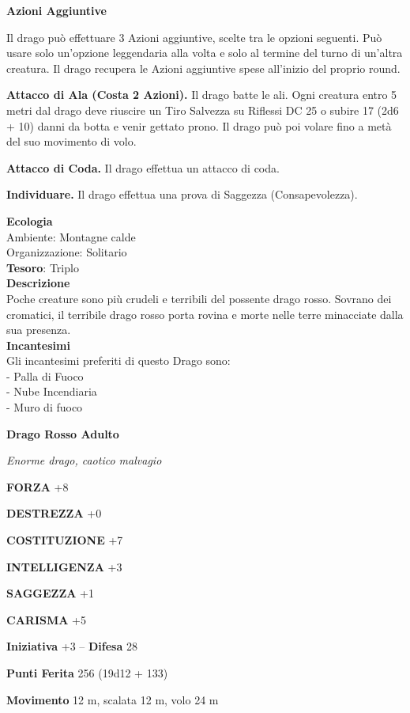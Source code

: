 \begin{multicols}{2}
	\textbf{Azioni Aggiuntive}

	Il drago può effettuare 3 Azioni aggiuntive, scelte tra le opzioni seguenti. Può usare solo un'opzione leggendaria alla volta e solo al termine del turno di un'altra creatura. Il drago recupera le Azioni aggiuntive spese all'inizio del proprio round.

	\textbf{Attacco di Ala (Costa 2 Azioni).} Il drago batte le ali. Ogni creatura entro 5 metri dal drago deve riuscire un Tiro Salvezza su Riflessi DC 25 o subire 17 (2d6 + 10) danni da botta e venir gettato prono. Il drago può poi volare fino a metà del suo movimento di volo.

	\textbf{Attacco di Coda.} Il drago effettua un attacco di coda.

	\textbf{Individuare.} Il drago effettua una prova di Saggezza (Consapevolezza).

	\textbf{Ecologia}\\
	Ambiente: Montagne calde\\
	Organizzazione: Solitario\\
	\textbf{Tesoro}: Triplo\\
	\textbf{Descrizione}\\
	Poche creature sono più crudeli e terribili del possente drago rosso. Sovrano dei cromatici, il terribile drago rosso porta rovina e morte nelle terre minacciate dalla sua presenza.\\
	\textbf{Incantesimi}\\
	Gli incantesimi preferiti di questo Drago sono:\\
	- Palla di Fuoco\\
	- Nube Incendiaria\\
	- Muro di fuoco


	\medskip{}\textbf{Drago Rosso Adulto}

	\textit{Enorme drago, caotico malvagio}

	\textbf{FORZA} +8

	\textbf{DESTREZZA} +0

	\textbf{COSTITUZIONE} +7

	\textbf{INTELLIGENZA} +3

	\textbf{SAGGEZZA} +1

	\textbf{CARISMA} +5

	\textbf{Iniziativa} +3 -- \textbf{Difesa} 28

	\textbf{Punti Ferita} 256 (19d12 + 133)

	\textbf{Movimento} 12 m, scalata 12 m, volo 24 m


\end{multicols}
